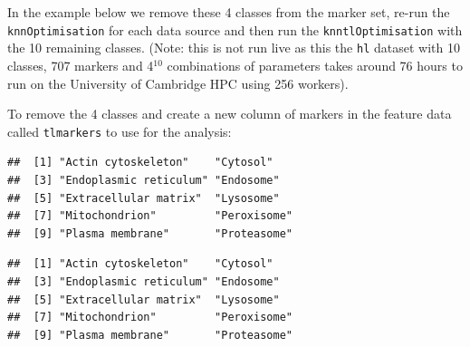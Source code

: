 In the example below we remove these 4 classes from the marker set,
re-run the \texttt{knnOptimisation} for each data source and then run
the \texttt{knntlOptimisation} with the 10 remaining classes. (Note:
this is not run live as this the \texttt{hl} dataset with 10 classes,
707 markers and 4$^{10}$ combinations of parameters takes around 76
hours to run on the University of Cambridge HPC using 256 workers).

To remove the 4 classes and create a new column of markers in the
feature data called \texttt{tlmarkers} to use for the analysis:



\begin{knitrout}
\color{fgcolor}\begin{kframe}
\begin{alltt}
\hlopt{$} \hlkwb{<-} \hlopt{$}
\hlopt{$} \hlkwb{<-} \hlopt{$}

  \hlkwb{<-} \hlstd{(}\hlstd{,} \hlstd{,}
           \hlstd{,}
           \hlstd{)}
   
   \hlkwb{<-}     \hlstd{=} \hlstd{)}
   \hlkwb{<-}     \hlstd{=} \hlstd{)}
\hlstd{\}}
  \hlstd{=} \hlstd{)}
\end{alltt}
\begin{verbatim}
##  [1] "Actin cytoskeleton"    "Cytosol"              
##  [3] "Endoplasmic reticulum" "Endosome"             
##  [5] "Extracellular matrix"  "Lysosome"             
##  [7] "Mitochondrion"         "Peroxisome"           
##  [9] "Plasma membrane"       "Proteasome"
\end{verbatim}
\begin{alltt}
  \hlstd{=} \hlstd{)}
\end{alltt}
\begin{verbatim}
##  [1] "Actin cytoskeleton"    "Cytosol"              
##  [3] "Endoplasmic reticulum" "Endosome"             
##  [5] "Extracellular matrix"  "Lysosome"             
##  [7] "Mitochondrion"         "Peroxisome"           
##  [9] "Plasma membrane"       "Proteasome"
\end{verbatim}
\end{kframe}
\end{knitrout}

